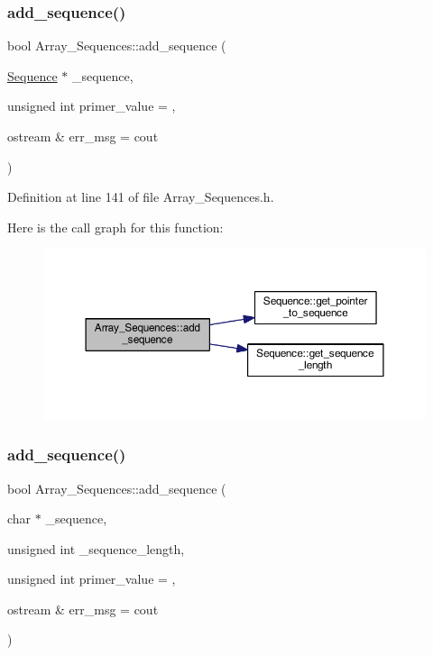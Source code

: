 \subsubsection{\texorpdfstring{add\+\_\+sequence()}{add\_sequence()}\hspace{0.1cm}{\footnotesize\ttfamily [1/2]}}
{\footnotesize\ttfamily bool Array\+\_\+\+Sequences\+::add\+\_\+sequence (\begin{DoxyParamCaption}\item[{\mbox{\hyperlink{class_sequence}{Sequence}} $\ast$}]{\+\_\+sequence,  }\item[{unsigned int}]{primer\+\_\+value = {},  }\item[{ostream \&}]{err\+\_\+msg = {\ttfamily cout} }\end{DoxyParamCaption})}



Definition at line 141 of file Array\+\_\+\+Sequences.\+h.

Here is the call graph for this function\+:
\nopagebreak
\begin{figure}[H]
\begin{center}
\leavevmode
\includegraphics[width=350pt]{class_array___sequences_ae4e47e71792255275b01afd35456a9a0_cgraph}
\end{center}
\end{figure}
\mbox{\label{class_array___sequences_aa5e6c65a85deac945f5d11442c4eb319}} 
\subsubsection{\texorpdfstring{add\+\_\+sequence()}{add\_sequence()}\hspace{0.1cm}{\footnotesize\ttfamily [2/2]}}
{\footnotesize\ttfamily bool Array\+\_\+\+Sequences\+::add\+\_\+sequence (\begin{DoxyParamCaption}\item[{char $\ast$}]{\+\_\+sequence,  }\item[{unsigned int}]{\+\_\+sequence\+\_\+length,  }\item[{unsigned int}]{primer\+\_\+value = {},  }\item[{ostream \&}]{err\+\_\+msg = {\ttfamily cout} }\end{DoxyParamCaption})}



